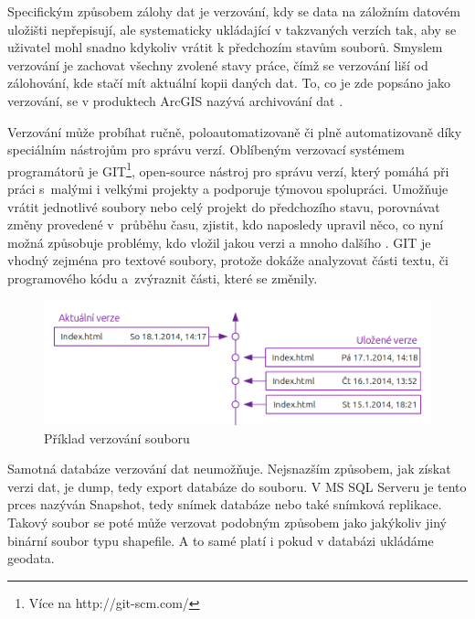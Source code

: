         Specifickým způsobem zálohy dat je verzování, kdy se data na záložním datovém
        uložišti nepřepisují, ale systematicky ukládající v takzvaných verzích tak, aby
        se uživatel mohl snadno kdykoliv vrátit k předchozím stavům souborů. Smyslem
        verzování je zachovat všechny zvolené stavy práce, čímž se verzování liší od
        zálohování, kde stačí mít aktuální kopii daných dat. To, co je zde popsáno jako
        verzování, se v produktech ArcGIS nazývá archivování dat \citep{Law2008}. 

        Verzování může probíhat ručně, poloautomatizovaně či plně automatizovaně díky
        speciálním nástrojům pro správu verzí. Oblíbeným verzovací systémem
        programátorů je GIT\footnote{Více na http://git-scm.com/}, open-source nástroj
        pro správu verzí, který pomáhá při práci s~malými i velkými projekty a
        podporuje týmovou spolupráci. Umožňuje vrátit jednotlivé soubory nebo celý
        projekt do předchozího stavu, porovnávat změny provedené v~průběhu času,
        zjistit, kdo naposledy upravil něco, co nyní možná způsobuje problémy, kdo
        vložil jakou verzi a mnoho dalšího \citep{Chacon2009}. GIT je vhodný zejména
        pro textové soubory, protože dokáže analyzovat části textu, či programového
        kódu a~zvýraznit části, které se změnily.
        
          \begin{figure}[H]
            \centering
            \includegraphics[scale=1]{../../../grafy/obr/schema_verzovani_maxiTence.png}
            \caption {Příklad verzování souboru}
          \end{figure}

        Samotná databáze verzování dat neumožňuje. Nejsnazším způsobem, jak získat
        verzi dat, je dump, tedy export databáze do souboru. V MS SQL Serveru je tento
        prces nazýván Snapshot, tedy snímek databáze nebo také snímková replikace.
        Takový soubor se poté může verzovat podobným způsobem jako jakýkoliv jiný
        binární soubor typu shapefile. A to samé platí i pokud v databázi ukládáme
        geodata. 

